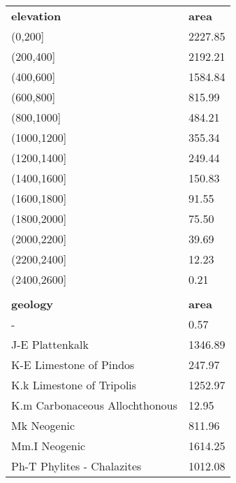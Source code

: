 \begin{longtable}{ll}
\textbf{elevation}                                 & \textbf{area}    \\
(0,200{]}                                          & 2227.85          \\
(200,400{]}                                        & 2192.21          \\
(400,600{]}                                        & 1584.84          \\
(600,800{]}                                        & 815.99           \\
(800,1000{]}                                       & 484.21           \\
(1000,1200{]}                                      & 355.34           \\
(1200,1400{]}                                      & 249.44           \\
(1400,1600{]}                                      & 150.83           \\
(1600,1800{]}                                      & 91.55            \\
(1800,2000{]}                                      & 75.50            \\
(2000,2200{]}                                      & 39.69            \\
(2200,2400{]}                                      & 12.23            \\
(2400,2600{]}                                      & 0.21             \\
                                                   &                  \\
\textbf{geology}                                   & \textbf{area}    \\
-                                                  & 0.57             \\
J-E Plattenkalk                                    & 1346.89          \\
K-E Limestone of Pindos                            & 247.97           \\
K.k Limestone of Tripolis                          & 1252.97          \\
K.m Carbonaceous Allochthonous                     & 12.95            \\
Mk Neogenic                                        & 811.96           \\
Mm.I Neogenic                                      & 1614.25          \\
Ph-T Phylites - Chalazites                         & 1012.08          \\

\end{longtable}

